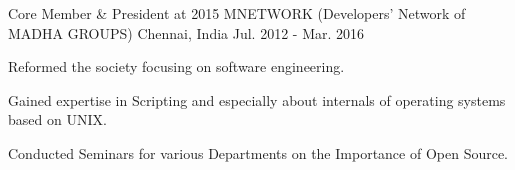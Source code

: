 

\begin{cventries}

  \cventry
    {Core Member \& President at 2015} %
    {MNETWORK (Developers' Network of MADHA GROUPS)} %
    {Chennai, India} %
    {Jul. 2012 - Mar. 2016} %
    {
      \begin{cvitems} %
        \item {Reformed the society focusing on software engineering.}
        \item {Gained expertise in Scripting and especially about internals of operating systems based on UNIX.}
        \item {Conducted Seminars for various Departments on the Importance of Open Source.}
      \end{cvitems}
    }

\end{cventries}
